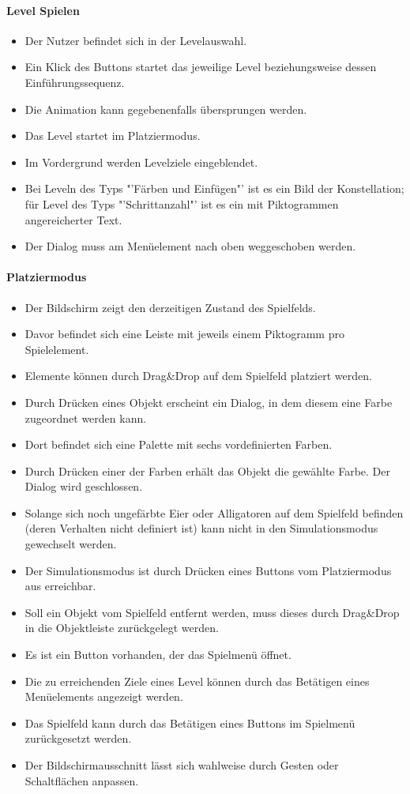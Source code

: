 \paragraph{Level Spielen}
\begin{itemize}
\item Der Nutzer befindet sich in der Levelauswahl.
\item Ein Klick des Buttons startet das jeweilige Level beziehungsweise dessen Einführungssequenz. 
\item Die Animation kann gegebenenfalls übersprungen werden.
\item Das Level startet im Platziermodus.
\item Im Vordergrund werden Levelziele eingeblendet.
\item Bei Leveln des Typs "'Färben und Einfügen"'  ist es ein Bild der Konstellation; für Level des Typs "'Schrittanzahl"' ist es ein mit Piktogrammen angereicherter Text.
\item Der Dialog muss am Menüelement nach oben weggeschoben werden. 
\end{itemize}


\paragraph{Platziermodus}
\begin{itemize}  
\item Der Bildschirm zeigt den derzeitigen Zustand des Spielfelds.
\item Davor befindet sich eine Leiste mit jeweils einem Piktogramm pro Spielelement.
\item Elemente können durch Drag\&Drop auf dem Spielfeld platziert werden. 
\item  Durch Drücken eines Objekt erscheint 
ein Dialog, in dem diesem eine Farbe zugeordnet werden kann.
\item Dort befindet sich eine Palette mit sechs vordefinierten Farben.
\item Durch Drücken einer der Farben erhält das Objekt die gewählte Farbe. Der Dialog wird geschlossen.
\item Solange sich noch ungefärbte Eier oder Alligatoren auf dem Spielfeld befinden (deren Verhalten
nicht definiert ist) kann nicht in den Simulationsmodus gewechselt werden.
\item Der Simulationsmodus ist durch Drücken eines Buttons vom Platziermodus
aus erreichbar.
\item Soll ein Objekt vom Spielfeld entfernt werden, muss dieses durch Drag\&Drop
in die Objektleiste zurückgelegt werden.
\item Es ist ein Button vorhanden, der das Spielmenü öffnet.
\item Die zu erreichenden Ziele eines Level können durch das Betätigen eines Menüelements angezeigt werden.
\item Das Spielfeld kann durch das Betätigen eines Buttons im Spielmenü zurückgesetzt werden.
\item Der Bildschirmausschnitt lässt sich wahlweise durch Gesten oder Schaltflächen anpassen.
\end{itemize}

